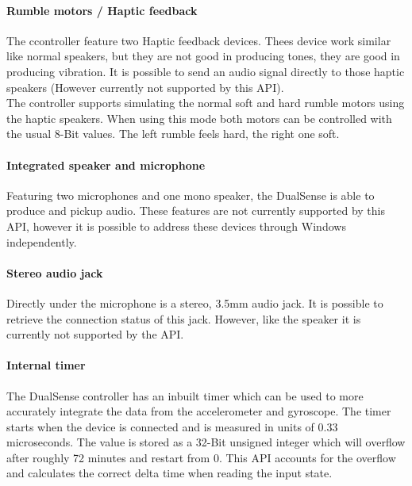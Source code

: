 \paragraph{Rumble motors / Haptic feedback}
The ccontroller feature two Haptic feedback devices. Thees device work similar like normal speakers, but they are not good in producing tones, they are good in producing vibration. It is possible to send an audio signal directly to those haptic speakers (However currently not supported by this API).\\
The controller supports simulating the normal soft and hard rumble motors using the haptic speakers. When using this mode both motors can be controlled with the usual 8-Bit values. The left rumble feels hard, the right one soft.

\paragraph{Integrated speaker and microphone}
Featuring two microphones and one mono speaker, the DualSense is able to produce and pickup audio. These features are not currently supported by this API, however it is possible to address these devices through Windows independently. 

\paragraph{Stereo audio jack}
Directly under the microphone is a stereo, 3.5mm audio jack. It is possible to retrieve the connection status of this jack. However, like the speaker it is currently not supported by the API.

\paragraph{Internal timer}
The DualSense controller has an inbuilt timer which can be used to more accurately integrate the data from the accelerometer and gyroscope. The timer starts when the device is connected and is measured in units of 0.33 microseconds. The value is stored as a 32-Bit unsigned integer which will overflow after roughly 72 minutes and restart from 0. This API accounts for the overflow and calculates the correct delta time when reading the input state.

\newpage